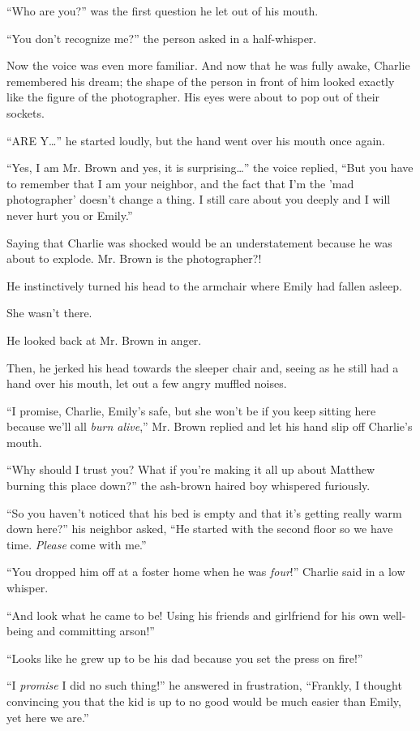 “Who are you?” was the first question he let out of his mouth.

“You don't recognize me?” the person asked in a half-whisper.

Now the voice was even more familiar. And now that he was fully awake, Charlie remembered his dream; the shape of the person in front of him looked exactly like the figure of the photographer. His eyes were about to pop out of their sockets.

“ARE Y…” he started loudly, but the hand went over his mouth once again.

“Yes, I am Mr. Brown and yes, it is surprising…” the voice replied, “But you have to remember that I am your neighbor, and the fact that I'm the 'mad photographer' doesn't change a thing. I still care about you deeply and I will never hurt you or Emily.”

Saying that Charlie was shocked would be an understatement because he was about to explode. Mr. Brown is the photographer?!

He instinctively turned his head to the armchair where Emily had fallen asleep.

She wasn't there.

He looked back at Mr. Brown in anger.

Then, he jerked his head towards the sleeper chair and, seeing as he still had a hand over his mouth, let out a few angry muffled noises.

“I promise, Charlie, Emily's safe, but she won't be if you keep sitting here because we'll all \textit{burn alive},” Mr. Brown replied and let his hand slip off Charlie's mouth.

“Why should I trust you? What if you're making it all up about Matthew burning this place down?” the ash-brown haired boy whispered furiously.

“So you haven't noticed that his bed is empty and that it's getting really warm down here?” his neighbor asked, “He started with the second floor so we have time. \textit{Please} come with me.”

“You dropped him off at a foster home when he was \textit{four}!” Charlie said in a low whisper.

“And look what he came to be! Using his friends and girlfriend for his own well-being and committing arson!”

“Looks like he grew up to be his dad because you set the press on fire!”

“I \textit{promise} I did no such thing!” he answered in frustration, “Frankly, I thought convincing you that the kid is up to no good would be much easier than Emily, yet here we are.”

